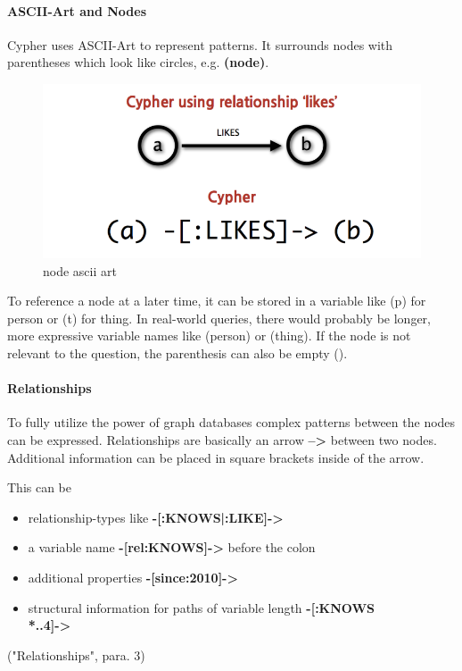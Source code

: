 \paragraph{ASCII-Art and Nodes}

Cypher uses ASCII-Art to represent patterns. It surrounds nodes with parentheses which look like circles, e.g. \textbf{(node)}. \cite["Nodes", para. 1]{NeoTechnologyInc.2017d}

\begin{figure}[H]
	\includegraphics[width=\linewidth,keepaspectratio]{images/neo4j/cypher_pattern_simple.png}
	\caption{node ascii art}
\end{figure}

To reference a node at a later time, it can be stored in a variable like (p) for person or (t) for thing.
In real-world queries, there would probably be longer, more expressive variable names like (person) or (thing).
If the node is not relevant to the question, the parenthesis can also be empty ().

\paragraph{Relationships}

To fully utilize the power of graph databases complex patterns between the nodes can be expressed.
Relationships are basically an arrow \textbf{-->} between two nodes. \cite["Relationships", para. 1]{NeoTechnologyInc.2017d}
Additional information can be placed in square brackets inside of the arrow.

This can be

\begin{itemize}
	\item relationship-types like \textbf{-[:KNOWS|:LIKE]->}
	\item a variable name \textbf{-[rel:KNOWS]->} before the colon
	\item additional properties \textbf{-[{since:2010}]->}
	\item structural information for paths of variable length \textbf{-[:KNOWS\\*..4]->}
\end{itemize} 
\cite{NeoTechnologyInc.2017d} ("Relationships", para. 3)

